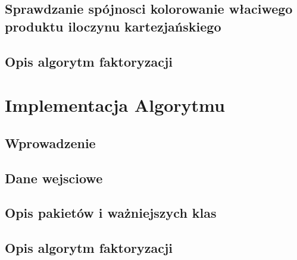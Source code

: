\documentclass[12pt,a4paper,titlepage]{article}
\begin{document}
\subsection{Sprawdzanie spójnosci kolorowanie właciwego produktu iloczynu kartezjańskiego}
\subsection{Opis algorytm faktoryzacji}
\section{Implementacja Algorytmu}
\subsection{Wprowadzenie}
\subsection{Dane wejsciowe}
\subsection{Opis pakietów i ważniejszych  klas}
\subsection{Opis algorytm faktoryzacji}
\end{document}
